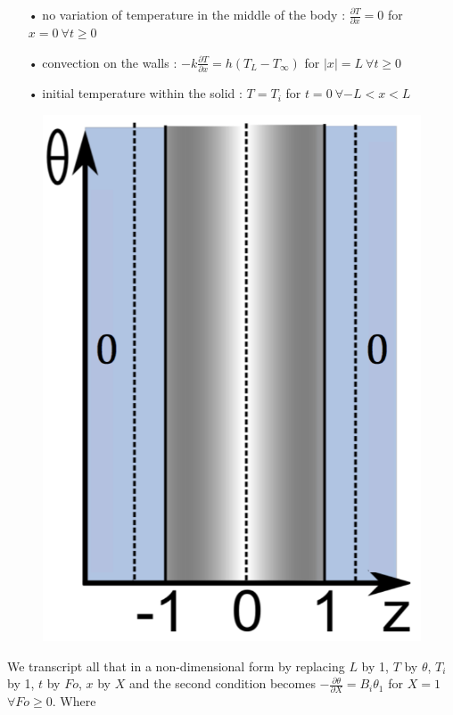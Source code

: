 	 	\begin{itemize}
	 		\item[•] no variation of temperature in the middle of the body : $ \frac{\partial T}{\partial x} = 0$ for $x = 0 \ \forall t \geq 0$
	 		\item[•] convection on the walls : $ -k\frac{\partial T}{\partial x} = h(T_L-T_\infty)$ for $|x| = L \ \forall t \geq 0$
	 		\item[•] initial temperature within the solid : $T = T_i$ for $t = 0 \ \forall -L < x < L$ \\
	 	\end{itemize}
	 	
	 	\begin{figure}
		\vspace{-8mm}
		\includegraphics[scale=0.2]{ch4/7}
		\end{figure}	
	 	We transcript all that in a non-dimensional form by replacing $L$ by 1, $T$ by $\theta$, $T_i$ by 1, $t$ by $Fo$, $x$ by $X$ and the second condition becomes $- \frac{\partial \theta}{\partial X} = B_i \theta _1$ for $X = 1$ $\forall Fo \geq 0$. Where
